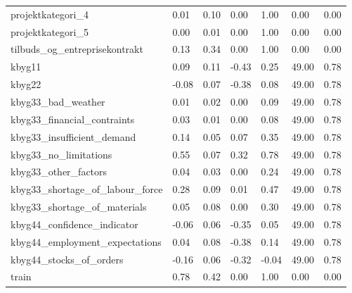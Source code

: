 \begin{landscape}
\begin{longtable}[h!]{lllllll}
projektkategori_4 & 0.01 & 0.10 & 0.00 & 1.00 & 0.00 & 0.00 \\
projektkategori_5 & 0.00 & 0.01 & 0.00 & 1.00 & 0.00 & 0.00 \\
tilbuds_og_entreprisekontrakt & 0.13 & 0.34 & 0.00 & 1.00 & 0.00 & 0.00 \\
kbyg11 & 0.09 & 0.11 & -0.43 & 0.25 & 49.00 & 0.78 \\
kbyg22 & -0.08 & 0.07 & -0.38 & 0.08 & 49.00 & 0.78 \\
kbyg33_bad_weather & 0.01 & 0.02 & 0.00 & 0.09 & 49.00 & 0.78 \\
kbyg33_financial_contraints & 0.03 & 0.01 & 0.00 & 0.08 & 49.00 & 0.78 \\
kbyg33_insufficient_demand & 0.14 & 0.05 & 0.07 & 0.35 & 49.00 & 0.78 \\
kbyg33_no_limitations & 0.55 & 0.07 & 0.32 & 0.78 & 49.00 & 0.78 \\
kbyg33_other_factors & 0.04 & 0.03 & 0.00 & 0.24 & 49.00 & 0.78 \\
kbyg33_shortage_of_labour_force & 0.28 & 0.09 & 0.01 & 0.47 & 49.00 & 0.78 \\
kbyg33_shortage_of_materials & 0.05 & 0.08 & 0.00 & 0.30 & 49.00 & 0.78 \\
kbyg44_confidence_indicator & -0.06 & 0.06 & -0.35 & 0.05 & 49.00 & 0.78 \\
kbyg44_employment_expectations & 0.04 & 0.08 & -0.38 & 0.14 & 49.00 & 0.78 \\
kbyg44_stocks_of_orders & -0.16 & 0.06 & -0.32 & -0.04 & 49.00 & 0.78 \\
train & 0.78 & 0.42 & 0.00 & 1.00 & 0.00 & 0.00 \\
\end{longtable}\end{landscape}
